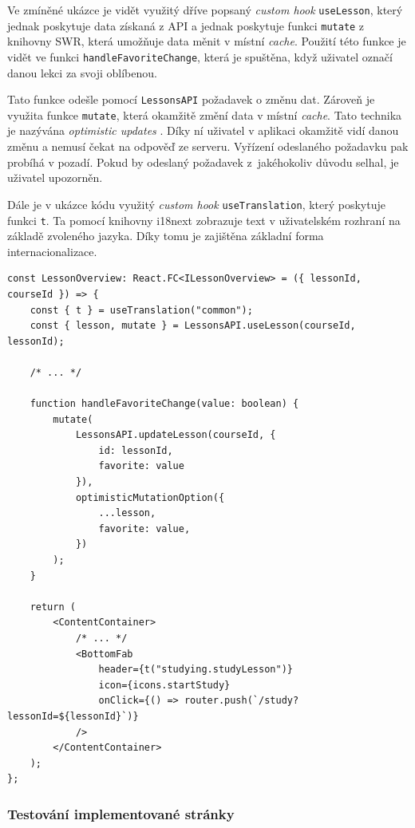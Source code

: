 Ve zmíněné ukázce je vidět využitý dříve popsaný \textit{custom hook} \texttt{useLesson}, který jednak poskytuje data získaná z API a jednak poskytuje funkci \texttt{mutate} z knihovny SWR, která umožňuje data měnit v místní \textit{cache}. Použití této funkce je vidět ve funkci \texttt{handleFavoriteChange}, která je spuštěna, když uživatel označí danou lekci za svoji oblíbenou.

Tato funkce odešle pomocí \texttt{LessonsAPI} požadavek o změnu dat. Zároveň je využita funkce \texttt{mutate}, která okamžitě změní data v místní \textit{cache}. Tato technika je nazývána \textit{optimistic updates} \cite{OptimisticUpdates}. Díky ní uživatel v aplikaci okamžitě vidí danou změnu a nemusí čekat na odpověď ze serveru. Vyřízení odeslaného požadavku pak probíhá v pozadí. Pokud by odeslaný požadavek z~jakéhokoliv důvodu selhal, je uživatel upozorněn.

Dále je v ukázce kódu využitý \textit{custom hook} \texttt{useTranslation}, který poskytuje funkci \texttt{t}. Ta pomocí knihovny i18next zobrazuje text v uživatelském rozhraní na základě zvoleného jazyka. Díky tomu je zajištěna základní forma internacionalizace.

\begin{listing}[!ht]
    \begin{verbatim}
const LessonOverview: React.FC<ILessonOverview> = ({ lessonId, courseId }) => {
    const { t } = useTranslation("common");
    const { lesson, mutate } = LessonsAPI.useLesson(courseId, lessonId);

    /* ... */

    function handleFavoriteChange(value: boolean) {
        mutate(
            LessonsAPI.updateLesson(courseId, { 
                id: lessonId, 
                favorite: value 
            }),
            optimisticMutationOption({
                ...lesson,
                favorite: value,
            })
        );
    }    

    return (
        <ContentContainer>
            /* ... */
            <BottomFab
                header={t("studying.studyLesson")}
                icon={icons.startStudy}
                onClick={() => router.push(`/study?lessonId=${lessonId}`)}
            />
        </ContentContainer>
    );
};
    \end{verbatim}
    \caption{Ukázka implementace stránky s přehledem lekce}
    \label{fig:ukazka-react-component}
\end{listing}

\subsubsection{Testování implementované stránky}

